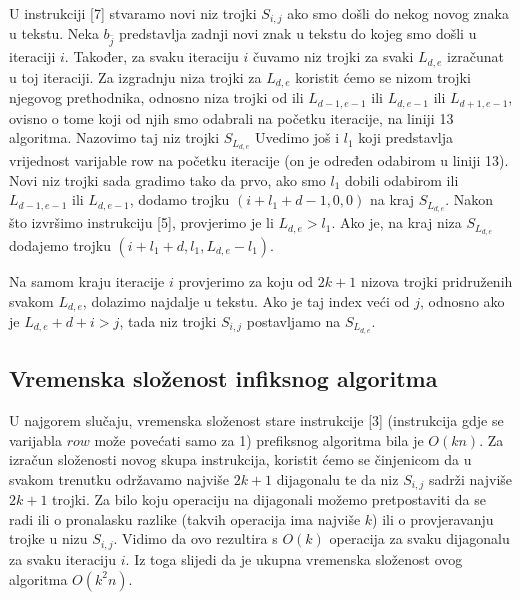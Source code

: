 \documentclass[times, utf8, zavrsni]{fer}
\begin{document}
U instrukciji [7] stvaramo novi niz trojki $S_{i,j}$ ako smo došli do nekog novog znaka u tekstu. Neka $b_{\bar{j}}$ predstavlja zadnji novi znak u tekstu do kojeg smo došli u iteraciji $i$. Također, za svaku iteraciju $i$ čuvamo niz trojki za svaki $L_{d,e}$ izračunat u toj iteraciji. Za izgradnju niza trojki za $L_{d,e}$ koristit ćemo se nizom trojki njegovog prethodnika, odnosno niza trojki od ili $L_{d-1,e-1}$ ili $L_{d,e-1}$ ili $L_{d+1,e-1}$, ovisno o tome koji od njih smo odabrali na početku iteracije, na liniji 13 algoritma. Nazovimo taj niz trojki $S_{L_{d,e}}$ Uvedimo još i $l_{1}$ koji predstavlja vrijednost varijable row na početku iteracije (on je određen odabirom u liniji 13). Novi niz trojki sada gradimo tako da prvo, ako smo $l_{1}$ dobili odabirom ili $L_{d-1,e-1}$ ili $L_{d,e-1}$, dodamo trojku $(i+l_{1}+d-1,0,0)$ na kraj $S_{L_{d,e}}$. Nakon što izvršimo instrukciju [5], provjerimo je li $L_{d,e}>l_{1}$. Ako je, na kraj niza $S_{L_{d,e}}$ dodajemo trojku $(i+l_{1}+d,l_{1},L_{d,e}-l_{1})$.

Na samom kraju iteracije $i$ provjerimo za koju od $2k+1$ nizova trojki pridruženih svakom $L_{d,e}$, dolazimo najdalje u tekstu. Ako je taj index veći od $j$, odnosno ako je $L_{d,e}+d+i>j$, tada niz trojki $S_{i,j}$ postavljamo na $S_{L_{d,e}}$.

\subsection{Vremenska složenost infiksnog algoritma}\label{ssec:slozenostInfix}
U najgorem slučaju, vremenska složenost stare instrukcije [3] (instrukcija gdje se varijabla $row$ može povećati samo za 1) prefiksnog algoritma bila je $O(kn)$. Za izračun složenosti novog skupa instrukcija, koristit ćemo se činjenicom da u svakom trenutku održavamo najviše $2k+1$ dijagonalu te da niz $S_{i,j}$ sadrži najviše $2k+1$ trojki. Za bilo koju operaciju na dijagonali možemo pretpostaviti da se radi ili o pronalasku razlike (takvih operacija ima najviše $k$) ili o provjeravanju trojke u nizu $S_{i,j}$. Vidimo da ovo rezultira s $O(k)$ operacija za svaku dijagonalu za svaku iteraciju $i$. Iz toga slijedi da je ukupna vremenska složenost ovog algoritma $O(k^2n)$.
\end{document}
